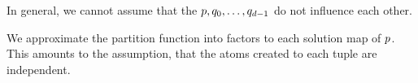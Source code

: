 %	







In general, we cannot assume that the $p,q_{0},\ldots,q_{d-1}$ do not influence each other.

We approximate the partition function into factors to each solution map of $p$.
This amounts to the assumption, that the atoms created to each tuple are independent.

